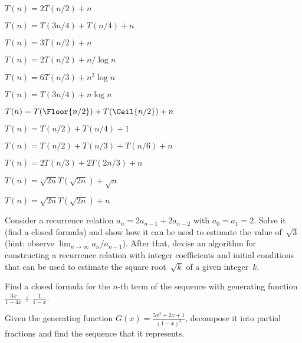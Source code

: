 \documentclass[a4paper,12pt]{article}
\begin{document}
\begin{tasks}[align=right,left=0pt]
    \begin{multicols}{2}
    \begin{subtasks}
        \item $T(n) = 2T(n/2) + n$
        \item $T(n) = T(3n/4) + T(n/4) + n$
        \item $T(n) = 3T(n/2) + n$
        \item $T(n) = 2T(n/2) + n/\log n$
        \item $T(n) = 6T(n/3) + n^2 \log n$
        \item $T(n) = T(3n/4) + n \log n$
        \item $T(n) = T(\Floor{n/2}) + T(\Ceil{n/2}) + n$
        \item $T(n) = T(n/2) + T(n/4) + 1$
        \item $T(n) = T(n/2) + T(n/3) + T(n/6) + n$
        \item $T(n) = 2T(n/3) + 2T(2n/3) + n$
        \item $T(n) = \sqrt{2n} T(\sqrt{2n}) + \sqrt{n}$
        \item $T(n) = \sqrt{2n} T(\sqrt{2n}) + n$
    \end{subtasks}
    \end{multicols}


    \item Consider a recurrence relation $a_n = 2a_{n-1} + 2a_{n-2}$ with $a_0 = a_1 = 2$.
    Solve it (\ie find a closed formula) and show how it can be used to estimate the value of~$\sqrt{3}$ (hint: observe $\lim_{n \to \infty} a_n / a_{n-1}$).
    After that, devise an algorithm for constructing a recurrence relation with integer coefficients and initial conditions that can be used to estimate the square root~$\sqrt{k}$ of a given integer~$k$.


    \item Find a closed formula for the $n$-th term of the sequence with generating function $\frac{3x}{1 - 4x} + \frac{1}{1-x}$.


    \item Given the generating function $G(x) = \frac{5x^2 + 2x + 1}{(1 - x)^3}$, decompose it into partial fractions and find the sequence that it represents.



\end{tasks}
\end{document}
